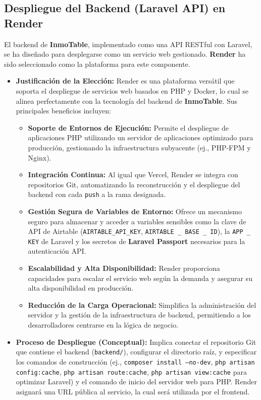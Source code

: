 \subsection{Despliegue del Backend (Laravel API) en Render}


El backend de \textbf{InmoTable}, implementado como una API RESTful con Laravel, se ha diseñado para desplegarse como un servicio web gestionado. \textbf{Render} \cite{render2024docs} ha sido seleccionado como la plataforma para este componente.

\begin{itemize}
    \item \textbf{Justificación de la Elección:} Render es una plataforma versátil que soporta el despliegue de servicios web basados en PHP y Docker, lo cual se alinea perfectamente con la tecnología del backend de \textbf{InmoTable}. Sus principales beneficios incluyen:

    \begin{itemize}
        \item \textbf{Soporte de Entornos de Ejecución:} Permite el despliegue de aplicaciones PHP utilizando un servidor de aplicaciones optimizado para producción, gestionando la infraestructura subyacente (ej., PHP-FPM y Nginx).

        \item \textbf{Integración Continua:} Al igual que Vercel, Render se integra con repositorios Git, automatizando la reconstrucción y el despliegue del backend con cada \texttt{push} a la rama designada.

        \item \textbf{Gestión Segura de Variables de Entorno:} Ofrece un mecanismo seguro para almacenar y acceder a variables sensibles como la clave de API de Airtable (\texttt{AIRTABLE\_API\_KEY}, \texttt{AIRTABLE \_ BASE \_ ID}), la \texttt{APP \_ KEY} de Laravel y los secretos de \textbf{Laravel Passport} necesarios para la autenticación API.

        \item \textbf{Escalabilidad y Alta Disponibilidad:} Render proporciona capacidades para escalar el servicio web según la demanda y asegurar su alta disponibilidad en producción.

        \item \textbf{Reducción de la Carga Operacional:} Simplifica la administración del servidor y la gestión de la infraestructura de backend, permitiendo a los desarrolladores centrarse en la lógica de negocio.
    \end{itemize}

    \item \textbf{Proceso de Despliegue (Conceptual):} Implica conectar el repositorio Git que contiene el backend (\texttt{backend/}), configurar el directorio raíz, y especificar los comandos de construcción (ej., \texttt{composer install --no-dev}, \texttt{php artisan config:cache}, \texttt{php artisan route:cache}, \texttt{php artisan view:cache} para optimizar Laravel) y el comando de inicio del servidor web para PHP. Render asignará una URL pública al servicio, la cual será utilizada por el frontend.
\end{itemize}


